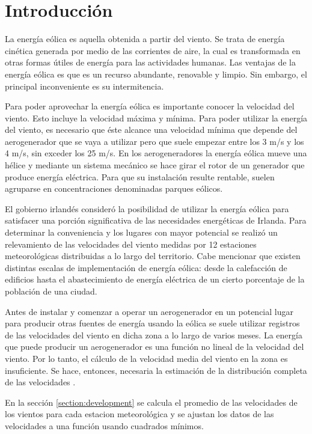\documentclass[journal, monochrome]{IEEEtran}
\begin{document}
\section{Introducción}
\par
La energía eólica es aquella obtenida a partir del viento. Se trata de energía cinética generada por medio de las corrientes de aire, la cual es transformada en otras formas útiles de energía para las actividades humanas. Las ventajas de la energía eólica es que es un recurso abundante, renovable y limpio. Sin embargo, el principal inconveniente es su intermitencia. 
\par
Para poder aprovechar la energía eólica es importante conocer la velocidad del viento. Esto incluye la velocidad máxima y mínima. Para poder utilizar la energía del viento, es necesario que éste alcance una velocidad mínima que depende del aerogenerador que se vaya a utilizar pero que suele empezar entre los 3 m/s y los 4 m/s, sin exceder los 25 m/s. En los aerogeneradores la energía eólica mueve una hélice y mediante un sistema mecánico se hace girar el rotor de un generador que produce energía eléctrica. Para que su instalación resulte rentable, suelen agruparse en concentraciones denominadas parques eólicos.
\par
El gobierno irlandés consideró la posibilidad de utilizar la energía eólica para satisfacer una porción significativa de las necesidades energéticas de Irlanda. Para determinar la conveniencia y los lugares con mayor potencial se realizó un relevamiento de las velocidades del viento medidas por 12 estaciones meteorológicas
distribuidas a lo largo del territorio. Cabe mencionar que existen distintas escalas de implementación de energía eólica: desde la calefacción de edificios hasta el abastecimiento de energía eléctrica de un cierto porcentaje de la población de una ciudad. 
\par
Antes de instalar y comenzar a operar un aerogenerador en un potencial lugar para producir otras fuentes de energía usando la eólica se suele utilizar registros de las velocidades del viento en dicha zona a lo largo de varios meses. La energía que puede producir un aerogenerador es una función no lineal de la velocidad del viento. Por lo tanto, el cálculo de la velocidad media del viento en la zona es insuficiente. Se hace, entonces, necesaria la estimación de la distribución completa de las velocidades \citep{haslett}.
\par
En la sección \ref{section:development} se calcula el promedio de las velocidades de los vientos para cada estacion meteorológica y se ajustan los datos de las velocidades a una función usando cuadrados mínimos.
\vspace{1cm}
\end{document}
